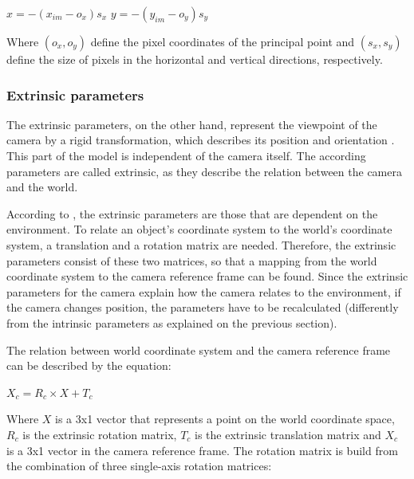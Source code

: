 \documentclass[msc, a4paper, classic, en]{ufbathesis}
\begin{document}
\begin{center}
$x = -(x_{im} - o_x)s_x$
$y = -(y_{im} - o_y)s_y$
\end{center}

Where $(o_x, o_y)$ define the pixel coordinates of the principal point and $(s_x, s_y)$ define the size of pixels in the horizontal and vertical directions, respectively.

\subsubsection{Extrinsic parameters}

The extrinsic parameters, on the other hand, represent the viewpoint of the camera by a rigid transformation, which describes its position and orientation \cite{bajramovic2010self}. This part of the model is independent of the camera itself. The according parameters are called extrinsic, as they describe the relation between the camera and the world.

According to \cite{tillapaugh2008indirect}, the extrinsic parameters are those that are dependent on the environment. To relate an object's coordinate system to the world's coordinate system, a translation and a rotation matrix are needed. Therefore, the extrinsic parameters consist of these two matrices, so that a mapping from the world coordinate system to the camera reference frame can be found. Since the extrinsic parameters for the camera explain how the camera relates to the environment, if the camera changes position, the parameters have to be recalculated (differently from the intrinsic parameters as explained on the previous section).

The relation between world coordinate system and the camera reference frame can be described by the equation:

\begin{center}
$X_c = R_c \times X + T_c$
\end{center}

Where $X$ is a 3x1 vector that represents a point on the world coordinate space, $R_c$ is the extrinsic rotation matrix, $T_c$ is the extrinsic translation matrix and $X_c$ is a 3x1 vector in the camera reference frame. The rotation matrix is build from the combination of three single-axis rotation matrices:
\end{document}

